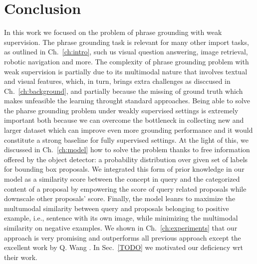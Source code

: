 \chapter{Conclusion}
\label{conclusion}

In this work we focused on the problem of phrase grounding with weak
supervision. The phrase grounding task is relevant for many other
import tasks, as outlined in Ch.~\ref{ch:intro}, such us visual
question answering, image retrieval, robotic navigation and more. The
complexity of phrase grounding problem with weak supervision is
partially due to its multimodal nature that involves textual and
visual features, which, in turn, brings extra challenges as disccused
in Ch.~\ref{ch:background}, and partially because the missing of
ground truth which makes unfeasible the learning throught standard
approaches. Being able to solve the pharse grounding problem under
weakly supervised settings is extremely important both because we can
overcome the bottleneck in collecting new and larger dataset which can
improve even more grounding performance and it would constitute a
strong baseline for fully supervised settings. At the light of this,
we discussed in Ch.~\ref{ch:model} how to solve the problem thanks to
free information offered by the object detector: a probability
distribution over given set of labels for bounding box proposals. We
integrated this form of prior knowledge in our model as a similarity
score between the concept in query and the categorized content of a
proposal by empowering the score of query related proposals while
downscale other proposals' score. Finally, the model leanrs to
maximize the multumodal similarity between query and proposals
belonging to positive example, i.e., sentence with its own image,
while minimizing the multimodal similarity on negative examples. We
shown in Ch.~\ref{ch:experiments} that our approach is very promising
and outperforms all previous approach except the excellent work by Q.
Wang \etal{} \cite{wang2020maf}. In Sec.~\ref{TODO} we motivated our
deficiency wrt their work. 

